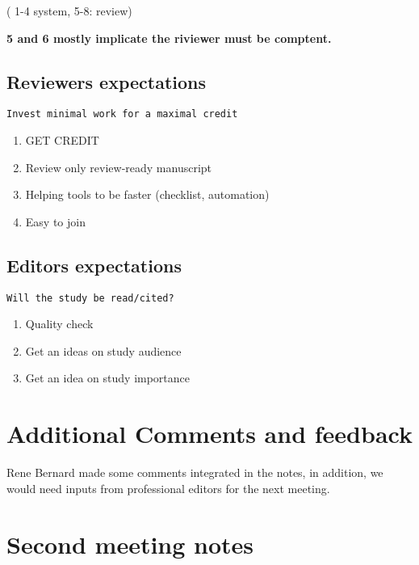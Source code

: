 \documentclass[]{article}
\begin{document}
( 1-4 system, 5-8: review)

\textbf{5 and 6 mostly implicate the riviewer must be comptent.}

\subsection{Reviewers expectations}\label{reviewers-expectations}

\begin{verbatim}
Invest minimal work for a maximal credit
\end{verbatim}

\begin{enumerate}
\def\labelenumi{\arabic{enumi}.}
\itemsep1pt\parskip0pt
\item
  GET CREDIT
\item
  Review only review-ready manuscript
\item
  Helping tools to be faster (checklist, automation)
\item
  Easy to join
\end{enumerate}

\subsection{Editors expectations}\label{editors-expectations}

\begin{verbatim}
Will the study be read/cited?
\end{verbatim}

\begin{enumerate}
\def\labelenumi{\arabic{enumi}.}
\itemsep1pt\parskip0pt
\item
  Quality check
\item
  Get an ideas on study audience
\item
  Get an idea on study importance
\end{enumerate}

\section{Additional Comments and
feedback}\label{additional-comments-and-feedback}

Rene Bernard made some comments integrated in the notes, in addition, we
would need inputs from professional editors for the next meeting.

\section{Second meeting notes}\label{second-meeting-notes}
\end{document}

